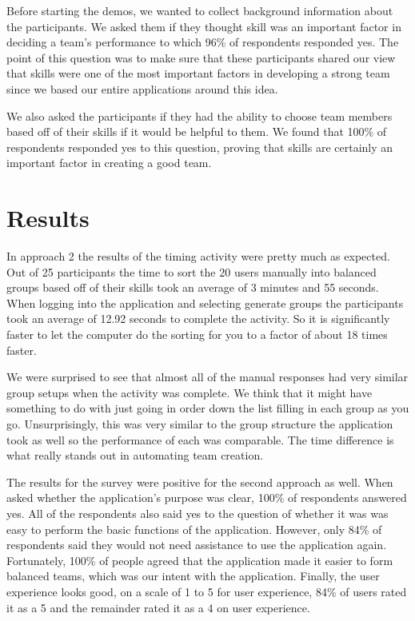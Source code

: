 \documentclass[conference]{IEEEtran}
\begin{document}
Before starting the demos, we wanted to collect background information about the participants. We asked them if they thought skill was an important factor in deciding a team's performance to which 96\% of respondents responded yes. The point of this question was to make sure that these participants shared our view that skills were one of the most important factors in developing a strong team since we based our entire applications around this idea. 

We also asked the participants if they had the ability to choose team members based off of their skills if it would be helpful to them. We found that 100\% of respondents responded yes to this question, proving that skills are certainly an important factor in creating a good team. 


\section{Results}
In approach 2 the results of the timing activity were pretty much as expected. Out of 25 participants the time to sort the 20 users manually into balanced groups based off of their skills took an average of 3 minutes and 55 seconds. When logging into the application and selecting generate groups the participants took an average of 12.92 seconds to complete the activity. So it is significantly faster to let the computer do the sorting for you to a factor of about 18 times faster. 

We were surprised to see that almost all of the manual responses had very similar group setups when the activity was complete. We think that it might have something to do with just going in order down the list filling in each group as you go. Unsurprisingly, this was very similar to the group structure the application took as well so the performance of each was comparable. The time difference is what really stands out in automating team creation.

The results for the survey were positive for the second approach as well. When asked whether the application's purpose was clear, 100\% of respondents answered yes. All of the respondents also said yes to the question of whether it was was easy to perform the basic functions of the application. However, only 84\% of respondents said they would not need assistance to use the application again. Fortunately, 100\% of people agreed that the application made it easier to form balanced teams, which was our intent with the application. Finally, the user experience looks good, on a scale of 1 to 5 for user experience, 84\% of users rated it as a 5 and the remainder rated it as a 4 on user experience. 
\end{document}
